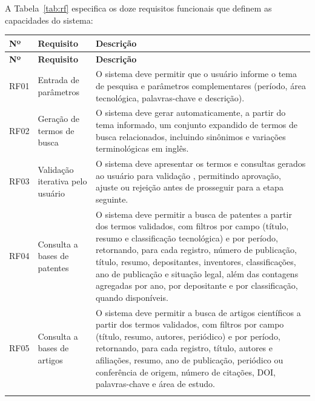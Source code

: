 \documentclass[12pt, a4paper]{article}
\begin{document}
  A Tabela~\ref{tab:rf} especifica os doze requisitos funcionais que definem as capacidades do sistema:
\begingroup
\setlength{\tabcolsep}{10pt}
\begin{longtable}{>{\centering\arraybackslash}p{0.6cm}
                  >{\raggedright\arraybackslash}p{3.2cm}
                  >{\raggedright\arraybackslash}p{8.5cm}}
\toprule
\textbf{Nº} & \textbf{Requisito} & \textbf{Descrição} \\
\midrule
\endfirsthead
\toprule
\textbf{Nº} & \textbf{Requisito} & \textbf{Descrição} \\
\midrule
\endhead
\bottomrule
\endfoot

RF01 & Entrada de parâmetros &
O sistema deve permitir que o usuário informe o tema de pesquisa e parâmetros
complementares (período, área tecnológica, palavras-chave e descrição). \\[4pt] \addlinespace[8pt]

RF02 & Geração de termos de busca &
O sistema deve gerar automaticamente, a partir do tema informado, um conjunto
expandido de termos de busca relacionados, incluindo sinônimos e variações
terminológicas em inglês. \\[4pt] \addlinespace[8pt]

RF03 & Validação iterativa pelo usuário &
O sistema deve apresentar os termos e consultas gerados ao usuário para
validação \cite{white2023}, permitindo aprovação, ajuste ou rejeição antes de
prosseguir para a etapa seguinte. \\[4pt] \addlinespace[8pt]

RF04 & Consulta a bases de patentes &
O sistema deve permitir a busca de patentes a partir dos termos validados, com
filtros por campo (título, resumo e classificação tecnológica) e por período,
retornando, para cada registro, número de publicação, título, resumo,
depositantes, inventores, classificações, ano de publicação e situação legal,
além das contagens agregadas por ano, por depositante e por classificação,
quando disponíveis. \\[4pt] \addlinespace[8pt]

RF05 & Consulta a bases de artigos &
O sistema deve permitir a busca de artigos científicos a partir dos termos
validados, com filtros por campo (título, resumo, autores, periódico) e por
período, retornando, para cada registro, título, autores e afiliações, resumo,
ano de publicação, periódico ou conferência de origem, número de citações,
DOI, palavras-chave e área de estudo. \\[4pt] \addlinespace[8pt]


\end{longtable}
\end{document}

